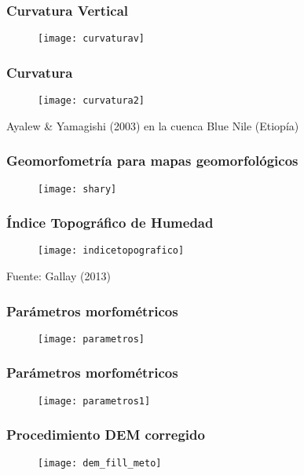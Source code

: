 \documentclass{beamer}
\begin{document}
\begin{frame}
\frametitle{Curvatura Vertical}
 \begin{figure}
    \centering
    \texttt{[image: curvaturav]}
  \end{figure}
\end{frame}
\begin{frame}
\frametitle{Curvatura}
 \begin{figure}
    \centering
    \texttt{[image: curvatura2]}
  \end{figure}
\tiny{Ayalew \& Yamagishi (2003) en la cuenca Blue Nile (Etiopía)}
\end{frame}
\begin{frame}
\frametitle{Geomorfometría para mapas geomorfológicos}
 \begin{figure}
    \centering
    \texttt{[image: shary]}
  \end{figure}
\end{frame}
\begin{frame}
\frametitle{Índice Topográfico de Humedad}
 \begin{figure}
    \centering
    \texttt{[image: indicetopografico]}
  \end{figure}
  \tiny{Fuente: Gallay (2013)}
\end{frame}
\begin{frame}
\frametitle{Parámetros morfométricos}
 \begin{figure}
    \centering
    \texttt{[image: parametros]}
  \end{figure}
\end{frame}
\begin{frame}
\frametitle{Parámetros morfométricos}
 \begin{figure}
    \centering
    \texttt{[image: parametros1]}
  \end{figure}
\end{frame}
\begin{frame}
\frametitle{Procedimiento DEM corregido}
 \begin{figure}
    \centering
    \texttt{[image: dem\_fill\_meto]}
  \end{figure}
\end{frame}
\end{document}
